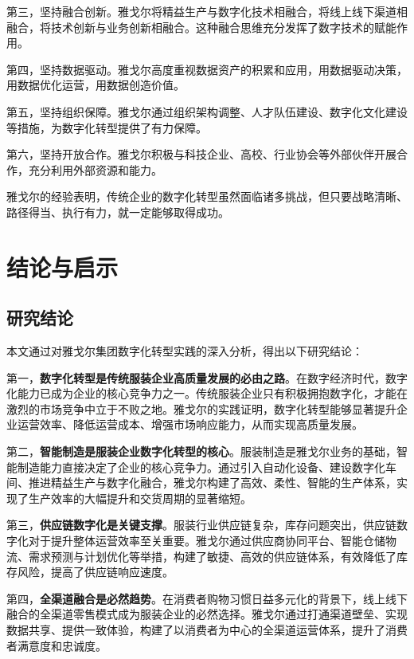 \documentclass[12pt,a4paper]{article}
\begin{document}
第三，坚持融合创新。雅戈尔将精益生产与数字化技术相融合，将线上线下渠道相融合，将技术创新与业务创新相融合。这种融合思维充分发挥了数字技术的赋能作用。

第四，坚持数据驱动。雅戈尔高度重视数据资产的积累和应用，用数据驱动决策，用数据优化运营，用数据创造价值。

第五，坚持组织保障。雅戈尔通过组织架构调整、人才队伍建设、数字化文化建设等措施，为数字化转型提供了有力保障。

第六，坚持开放合作。雅戈尔积极与科技企业、高校、行业协会等外部伙伴开展合作，充分利用外部资源和能力。

雅戈尔的经验表明，传统企业的数字化转型虽然面临诸多挑战，但只要战略清晰、路径得当、执行有力，就一定能够取得成功。

\newpage

\section{结论与启示}

\subsection{研究结论}

本文通过对雅戈尔集团数字化转型实践的深入分析，得出以下研究结论：

第一，\textbf{数字化转型是传统服装企业高质量发展的必由之路}。在数字经济时代，数字化能力已成为企业的核心竞争力之一。传统服装企业只有积极拥抱数字化，才能在激烈的市场竞争中立于不败之地。雅戈尔的实践证明，数字化转型能够显著提升企业运营效率、降低运营成本、增强市场响应能力，从而实现高质量发展。

第二，\textbf{智能制造是服装企业数字化转型的核心}。服装制造是雅戈尔业务的基础，智能制造能力直接决定了企业的核心竞争力。通过引入自动化设备、建设数字化车间、推进精益生产与数字化融合，雅戈尔构建了高效、柔性、智能的生产体系，实现了生产效率的大幅提升和交货周期的显著缩短。

第三，\textbf{供应链数字化是关键支撑}。服装行业供应链复杂，库存问题突出，供应链数字化对于提升整体运营效率至关重要。雅戈尔通过供应商协同平台、智能仓储物流、需求预测与计划优化等举措，构建了敏捷、高效的供应链体系，有效降低了库存风险，提高了供应链响应速度。

第四，\textbf{全渠道融合是必然趋势}。在消费者购物习惯日益多元化的背景下，线上线下融合的全渠道零售模式成为服装企业的必然选择。雅戈尔通过打通渠道壁垒、实现数据共享、提供一致体验，构建了以消费者为中心的全渠道运营体系，提升了消费者满意度和忠诚度。
\end{document}
